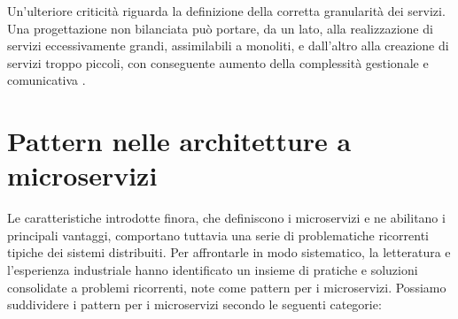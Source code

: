 Un’ulteriore criticità riguarda la definizione della corretta granularità dei servizi. Una progettazione non bilanciata può portare, da un lato, alla realizzazione di servizi eccessivamente grandi, assimilabili a monoliti, e dall’altro alla creazione di servizi troppo piccoli, con conseguente aumento della complessità gestionale e comunicativa \cite{Soldani2018PainsGains}.

\section{Pattern nelle architetture a microservizi}

\label{sec:par2_4}
Le caratteristiche introdotte finora, che definiscono i microservizi e ne abilitano i principali vantaggi, comportano tuttavia una serie di problematiche ricorrenti tipiche dei sistemi distribuiti. Per affrontarle in modo sistematico, la letteratura e l’esperienza industriale hanno identificato un insieme di pratiche e soluzioni consolidate a problemi ricorrenti, note come pattern per i microservizi.
Possiamo suddividere i pattern per i microservizi secondo le seguenti categorie: 
